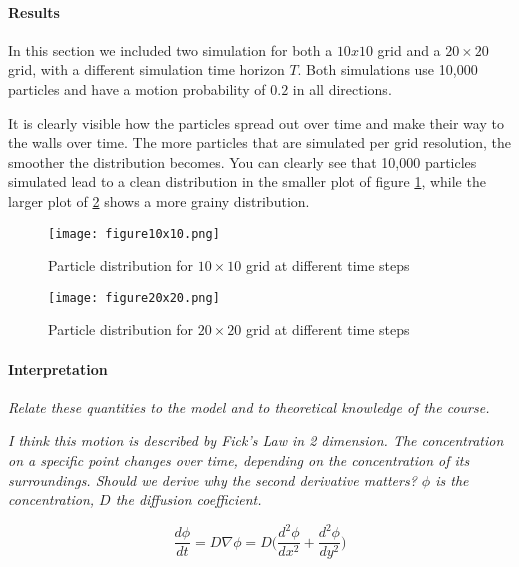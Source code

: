 \paragraph{Results}
In this section we included two simulation for both a $10x10$ grid and a $20 \times 20$ grid, with a different simulation time horizon $T$. Both simulations use 10,000 particles and have a motion probability of $0.2$ in all directions. \newline

It is clearly visible how the particles spread out over time and make their way to the walls over time. The more particles that are simulated per grid resolution, the smoother the distribution becomes. You can clearly see that 10,000 particles simulated lead to a clean distribution in the smaller plot of figure \ref{fig:RandomWalk10}, while the larger plot of \ref{fig:RandomWalk20} shows a more grainy distribution.

\begin{figure}[htb]
    \label{fig:RandomWalk10}
	\centering
	\texttt{[image: figure10x10.png]}       
	\caption{Particle distribution for $10 \times 10$ grid at different time steps}
\end{figure}

\begin{figure}[htb]
    \label{fig:RandomWalk20}
	\centering
	\texttt{[image: figure20x20.png]}       
	\caption{Particle distribution for $20 \times 20$ grid at different time steps}
\end{figure}


 
\paragraph{Interpretation}
{\it Relate these quantities to the model and to theoretical knowledge of the course.}\newline

{\it I think this motion is described by Fick's Law in 2 dimension. The concentration on a specific point changes over time, depending on the concentration of its surroundings. Should we derive why the second derivative matters? $\phi$ is the concentration, $D$ the diffusion coefficient.}

\begin{equation}
\label{eq:FicksLaw}
\frac{d\phi}{dt} = D\nabla\phi = D \big(\frac{d^2\phi}{dx^2} + \frac{d^2\phi}{dy^2}\big)
\end{equation}


